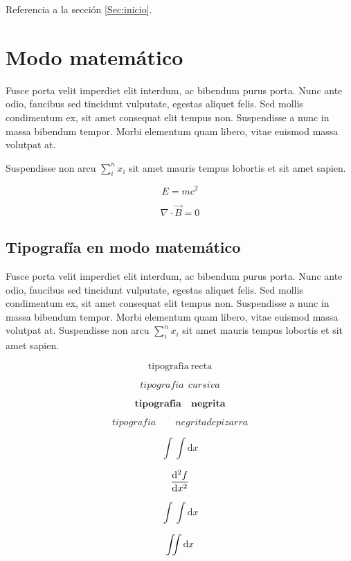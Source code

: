 \documentclass[../preambulo.tex]{subfiles}
\begin{document}
Referencia a la sección \ref{Sec:inicio}.



\section*{Modo matemático}


Fusce porta velit imperdiet elit interdum, ac bibendum purus porta. Nunc ante odio, faucibus sed tincidunt vulputate, egestas aliquet felis. Sed mollis condimentum ex, sit amet consequat elit tempus non. Suspendisse a nunc in massa bibendum tempor. Morbi elementum quam libero, vitae euismod massa volutpat at.

Suspendisse non arcu $\sum_i ^n x_i$ sit amet mauris tempus lobortis et sit amet sapien. 

\begin{equation}
	E = mc^2
\end{equation}


\[
	\nabla \cdot %
	\vec{ B } = 0
\]



\subsection*{Tipografía en modo matemático}


Fusce porta velit imperdiet elit interdum, ac bibendum purus porta. Nunc ante odio, faucibus sed tincidunt vulputate, egestas aliquet felis. Sed mollis condimentum ex, sit amet consequat elit tempus non. Suspendisse a nunc in massa bibendum tempor. Morbi elementum quam libero, vitae euismod massa volutpat at. Suspendisse non arcu $\sum_i ^n x_i$ sit amet mauris tempus lobortis et sit amet sapien. 


\[
		\mathrm{tipografia\ recta}
\]

\[
		\mathit{tipografia\ \ cursiva}
\]

\[
		\mathbf{tipografia\quad negrita}
\]

\[
		tipografia\qquad negrita de pizarra
\]

\[
		\int \int \mathrm{d} x
\]

\[
		\frac{ \mathrm{d} ^{2} f }{ \mathrm{d} x ^{2} }
\]

\[
		\int \! \! \! \int \mathrm{d} x
\]

\[
		\iint \mathrm{d} x
\]
\end{document}
